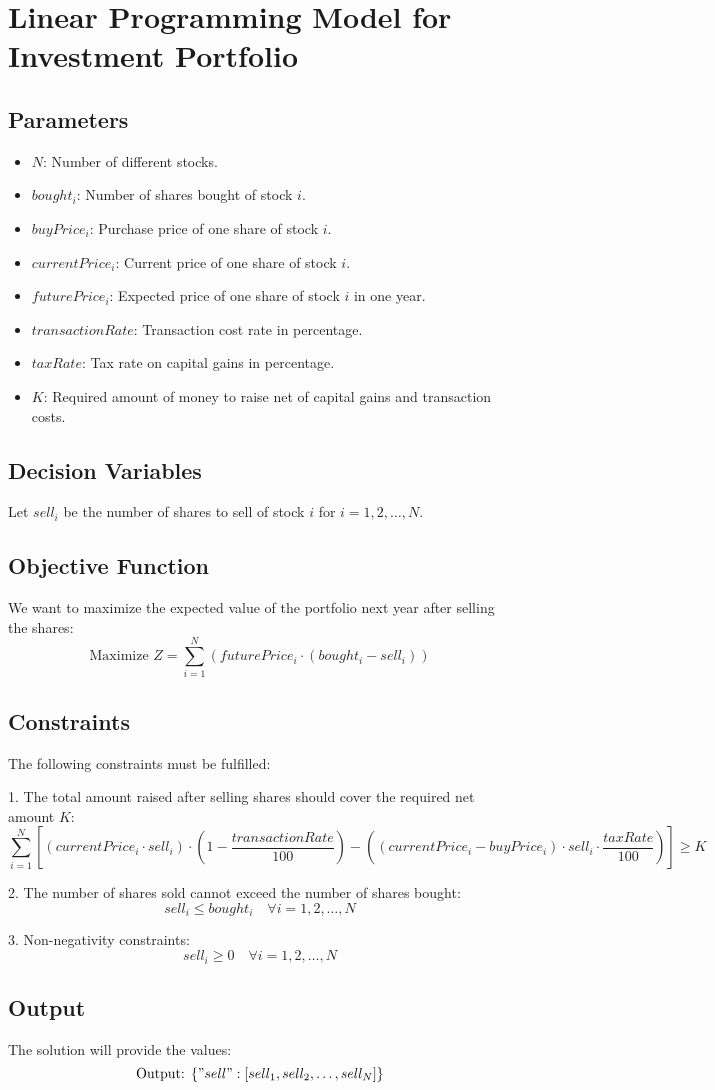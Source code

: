 \documentclass{article}
\begin{document}
\section*{Linear Programming Model for Investment Portfolio}

\subsection*{Parameters}
\begin{itemize}
    \item $N$: Number of different stocks.
    \item $bought_i$: Number of shares bought of stock $i$.
    \item $buyPrice_i$: Purchase price of one share of stock $i$.
    \item $currentPrice_i$: Current price of one share of stock $i$.
    \item $futurePrice_i$: Expected price of one share of stock $i$ in one year.
    \item $transactionRate$: Transaction cost rate in percentage.
    \item $taxRate$: Tax rate on capital gains in percentage.
    \item $K$: Required amount of money to raise net of capital gains and transaction costs.
\end{itemize}

\subsection*{Decision Variables}
Let $sell_i$ be the number of shares to sell of stock $i$ for $i = 1, 2, \ldots, N$.

\subsection*{Objective Function}
We want to maximize the expected value of the portfolio next year after selling the shares:
\[
\text{Maximize } Z = \sum_{i=1}^{N} \left( futurePrice_i \cdot (bought_i - sell_i) \right)
\]

\subsection*{Constraints}
The following constraints must be fulfilled:

1. The total amount raised after selling shares should cover the required net amount $K$:
\[
\sum_{i=1}^{N} \left[ (currentPrice_i \cdot sell_i) \cdot (1 - \frac{transactionRate}{100}) - \left( (currentPrice_i - buyPrice_i) \cdot sell_i \cdot \frac{taxRate}{100} \right) \right] \geq K
\]

2. The number of shares sold cannot exceed the number of shares bought:
\[
sell_i \leq bought_i \quad \forall i = 1, 2, \ldots, N
\]

3. Non-negativity constraints:
\[
sell_i \geq 0 \quad \forall i = 1, 2, \ldots, N
\]

\subsection*{Output}
The solution will provide the values:
\[
\text{Output: } \{ "sell": [sell_1, sell_2, \ldots, sell_N] \}
\]
\end{document}
